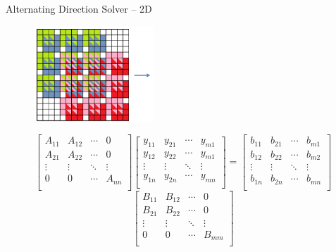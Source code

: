 \documentclass[c]{beamer}
\begin{document}
\begin{frame}[fragile]{Alternating Direction Solver -- 2D}

\begin{figure}
  \centering
  \includegraphics[width=0.4\textwidth]{img/2Dmatrix}
\end{figure}
\begin{equation*}
  \begin{bmatrix}
    A_{11} & A_{12} & \cdots & 0 \\
    A_{21} & A_{22} & \cdots & 0 \\
    \vdots & \vdots & \ddots & \vdots \\
    0 & 0 & \cdots & A_{nn} \\
  \end{bmatrix}
  \begin{bmatrix}
    y_{11} & y_{21} & \cdots & y_{m1}
    \\
    y_{12} & y_{22} & \cdots & y_{m1}
    \\
    \vdots & \vdots & \ddots & \vdots \\
    y_{1n} & y_{2n} & \cdots & y_{mn}
    \\
  \end{bmatrix}
  =
  \begin{bmatrix}
    b_{11} & b_{21} & \cdots & b_{m1} \\
    b_{12} & b_{22} & \cdots & b_{m2} \\
    \vdots & \vdots & \ddots & \vdots \\
    b_{1n} & b_{2n} & \cdots & b_{mn} \\
  \end{bmatrix}
\end{equation*}
\begin{equation*}
  \begin{bmatrix}
    B_{11} & B_{12} & \cdots & 0 \\
    B_{21} & B_{22} & \cdots & 0 \\
    \vdots & \vdots & \ddots & \vdots \\
    0 & 0 & \cdots & B_{mm} \\

\end{bmatrix}
\end{equation*}
\end{frame}
\end{document}
